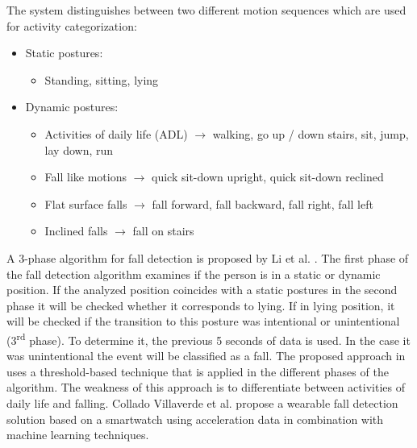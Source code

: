 \documentclass[10pt,journal,compsoc]{IEEEtran}
\begin{document}
The system distinguishes between two different motion sequences which are used for activity categorization: 
\begin{itemize}
	\item Static postures:
	\begin{itemize}
		\item Standing, sitting, lying
	\end{itemize}
	\item Dynamic postures:
	\begin{itemize}
		\item Activities of daily life (ADL) $\rightarrow$ walking, go up / down stairs, sit, jump, lay down, run
		\item Fall like motions $\rightarrow$ quick sit-down upright, quick sit-down reclined
		\item Flat surface falls $\rightarrow$ fall forward, fall backward, fall right, fall left
		\item Inclined falls $\rightarrow$ fall on stairs
	\end{itemize}
\end{itemize}
A 3-phase algorithm for fall detection is proposed by Li et al. \cite{Li2009}. The first phase of the fall detection algorithm examines if the person is in a static or dynamic position. If the analyzed position coincides with a static postures in the second phase it will be checked whether it corresponds to lying. If in lying position, it will be checked if the transition to this posture was intentional or unintentional (3\textsuperscript{rd} phase). To determine it, the previous 5 seconds of data is used. In the case it was unintentional the event will be classified as a fall. The proposed approach in \cite{Li2009} uses a threshold-based technique that is applied in the different phases of the algorithm. The weakness of this approach is to differentiate between activities of daily life and falling. Collado Villaverde et al. \cite{colladomachine} propose a wearable fall detection solution based on a smartwatch using acceleration data in combination with machine learning techniques.
\end{document}
